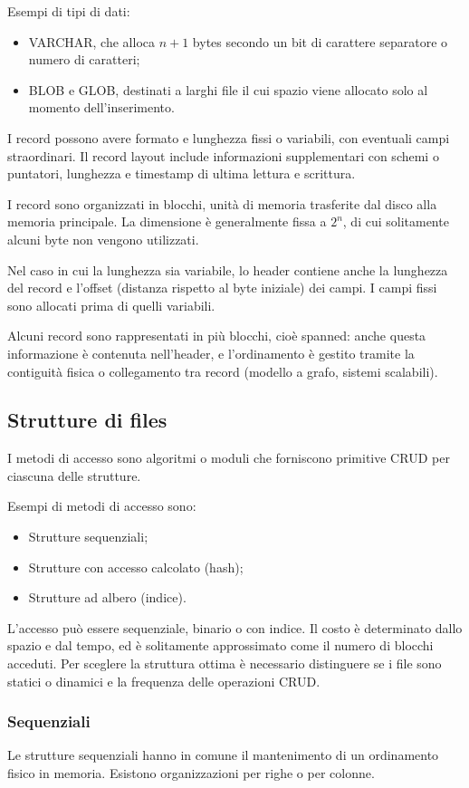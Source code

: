 Esempi di tipi di dati:
\begin{itemize}
	\item VARCHAR, che alloca $n + 1$ bytes secondo un bit di carattere separatore o numero di caratteri;
	\item BLOB e GLOB, destinati a larghi file il cui spazio viene allocato solo al momento dell'inserimento.
\end{itemize}

I record possono avere formato e lunghezza fissi o variabili, con eventuali campi straordinari. Il record layout include informazioni supplementari con schemi o puntatori, lunghezza e timestamp di ultima lettura e scrittura. 

I record sono organizzati in blocchi, unità di memoria trasferite dal disco alla memoria principale. La dimensione è generalmente fissa a $2^n$, di cui solitamente alcuni byte non vengono utilizzati. 

Nel caso in cui la lunghezza sia variabile, lo header contiene anche la lunghezza del record e l'offset (distanza rispetto al byte iniziale) dei campi. I campi fissi sono allocati prima di quelli variabili. 

Alcuni record sono rappresentati in più blocchi, cioè spanned: anche questa informazione è contenuta nell'header, e l'ordinamento è gestito tramite la contiguità fisica o collegamento tra record (modello a grafo, sistemi scalabili). 

\subsection{Strutture di files}
I metodi di accesso sono algoritmi o moduli che forniscono primitive CRUD per ciascuna delle strutture.

Esempi di metodi di accesso sono: 
\begin{itemize}
	\item Strutture sequenziali;
	\item Strutture con accesso calcolato (hash);
	\item Strutture ad albero (indice).
\end{itemize}

L'accesso può essere sequenziale, binario o con indice. Il costo è determinato dallo spazio e dal tempo, ed è solitamente approssimato come il numero di blocchi acceduti. Per sceglere la struttura ottima è necessario distinguere se i file sono statici o dinamici e la frequenza delle operazioni CRUD.

\subsubsection{Sequenziali}
Le strutture sequenziali hanno in comune il mantenimento di un ordinamento fisico in memoria. Esistono organizzazioni per righe o per colonne.

